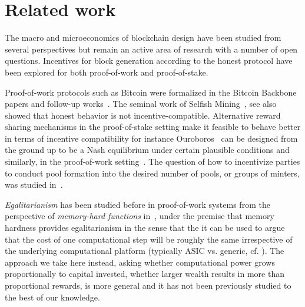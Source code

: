 \section{Related work}\label{sec:related}
The macro and microeconomics of blockchain design have been studied from
several perspectives but remain an active area of research with a number of open questions.
Incentives for block generation
according to the honest protocol have been explored for both proof-of-work and
proof-of-stake.

Proof-of-work protocols such as Bitcoin were formalized in the Bitcoin
Backbone~\cite{EC:GarKiaLeo15,C:GarKiaLeo17} papers and follow-up
works~\cite{pass2017analysis}. The seminal work of Selfish
Mining~\cite{FC:EyaSir14}, see also \cite{FC:SapSomZoh16,kiayias2016blockchain} showed that
honest behavior is not incentive-compatible. Alternative reward sharing mechanisms
in the proof-of-stake  setting
make it feasible to behave better in terms of incentive compatibility for instance
Ouroboros~\cite{C:KRDO17} can be designed from the ground up to be a Nash
equilibrium under certain plausible conditions
and similarly, in the proof-of-work setting~\cite{PODC:PasShi17}.
The question of how to incentivize parties to conduct
pool formation into the desired number of pools, or groups of minters, was
studied in~\cite{bkks2018}.
%

\emph{Egalitarianism} has been studied before in
proof-of-work systems from the perspective of
\emph{memory-hard functions} in~\cite{alwen2017depth,biryukov2016egalitarian},
under the premise that memory hardness provides egalitarianism in the sense
that the it can be used to argue that the
cost of one computational step will be roughly  the same irrespective of the
underlying
computational platform (typically ASIC vs. generic, cf.  \cite{biryukov2016egalitarian}).
The approach we take here instead, asking whether
computational power grows proportionally to capital invested, \ie
whether larger wealth results in more than proportional rewards,
  is more general and it has not
been previously studied to the best of our knowledge.

